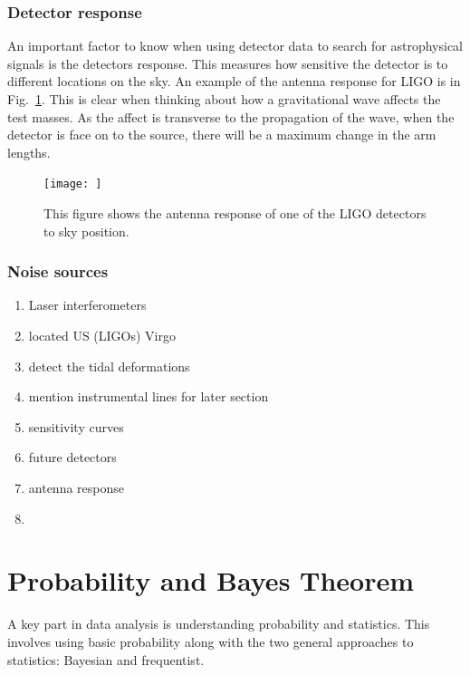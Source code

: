 \subsubsection{Detector response}

An important factor to know when using detector data to search for astrophysical signals is the detectors response.
This measures how sensitive the detector is to different locations on the sky.
An example of the antenna response for \ac{LIGO} is in Fig.~\ref{detectors:response}.
This is clear when thinking about how a gravitational wave affects the test masses. 
As the affect is transverse to the propagation of the wave, when the detector is face on to the source, there will be a maximum change in the arm lengths.

\begin{figure}
    \centering
    \texttt{[image: ]}
    \caption{This figure shows the antenna response of one of the \ac{LIGO} detectors to sky position.}
    \label{detectors:response}
\end{figure}

\subsubsection{\label{intro:detector:noise}Noise sources}
\begin{enumerate}
    \item Laser interferometers
    \item located US (LIGOs) Virgo
    \item detect the tidal deformations 
    \item mention instrumental lines for later section
    \item sensitivity curves
    \item future detectors
    \item antenna response
    \item 
\end{enumerate}

\section{\label{intro:prob}Probability and Bayes Theorem}

A key part in data analysis is understanding probability and statistics. 
This involves using basic probability along with the two general approaches to statistics: Bayesian and frequentist. 

